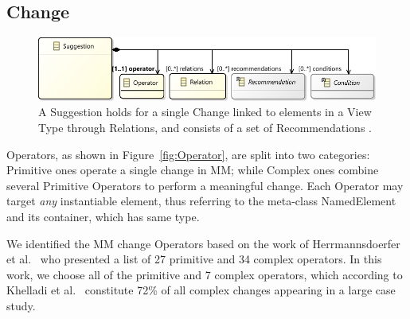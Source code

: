\subsection{Change}
\label{sec:Suggestion:Change}

\begin{figure}[t]
    \centering
    \includegraphics[width=\columnwidth]{images/SuggestionWithCondition.pdf}
    \caption{A \textsf{Suggestion} holds for a single \textsf{Change} linked to 
		elements in a View Type through \textsf{Relation}s, and consists of a set of \textsf{Recommendation}s 
		.}
    \label{fig:Suggestion}
\end{figure}

\textsf{Operator}s, as shown in Figure~\ref{fig:Operator}, are split into two categories:
\textsf{Primitive} ones operate a single change in \textsf{MM}; while
\textsf{Complex} ones combine several \textsf{Primitive} \textsf{Operator}s
to perform a meaningful change. 
Each \textsf{Operator} may target \emph{any} instantiable \metamodel element, 
thus referring to the meta-class \textsf{NamedElement} and its container, which has same type.

We identified the MM change \textsf{Operator}s based on the work of Herrmannsdoerfer et al.~\cite{herrmannsdoerfer_extensive_2011} who presented a list of 27 primitive and 34 complex operators. In this work, we choose all of the primitive and 7 complex operators, which according to Khelladi et al.~\cite{khelladi_detecting_2015} constitute 72\% of all complex changes appearing in a large case study. 


